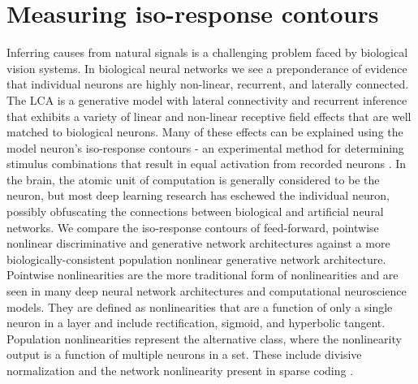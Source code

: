 \section{Measuring iso-response contours}\label{sec:ch4_iso_contours}
Inferring causes from natural signals is a challenging problem faced by biological vision systems.
In biological neural networks we see a preponderance of evidence that individual neurons are highly non-linear, recurrent, and laterally connected.
The LCA is a generative model with lateral connectivity and recurrent inference that exhibits a variety of linear \parencite{olshausen1996emergence} and non-linear \parencite{zhu2013visual} receptive field effects that are well matched to biological neurons.
Many of these effects can be explained using the model neuron’s iso-response contours - an experimental method for determining stimulus combinations that result in equal activation from recorded neurons \parencite{golden2016conjectures}.
In the brain, the atomic unit of computation is generally considered to be the neuron, but most deep learning research has eschewed the individual neuron, possibly obfuscating the connections between biological and artificial neural networks.
We compare the iso-response contours of feed-forward, pointwise nonlinear discriminative and generative network architectures against a more biologically-consistent population nonlinear generative network architecture.
Pointwise nonlinearities are the more traditional form of nonlinearities and are seen in many deep neural network architectures and computational neuroscience models.
They are defined as nonlinearities that are a function of only a single neuron in a layer and include rectification, sigmoid, and hyperbolic tangent.
Population nonlinearities represent the alternative class, where the nonlinearity output is a function of multiple neurons in a set.
These include divisive normalization \parencite{carandini2012normalization, balle2016end} and the network nonlinearity present in sparse coding \parencite{rozell2008sparse, olshausen1997sparse}.

